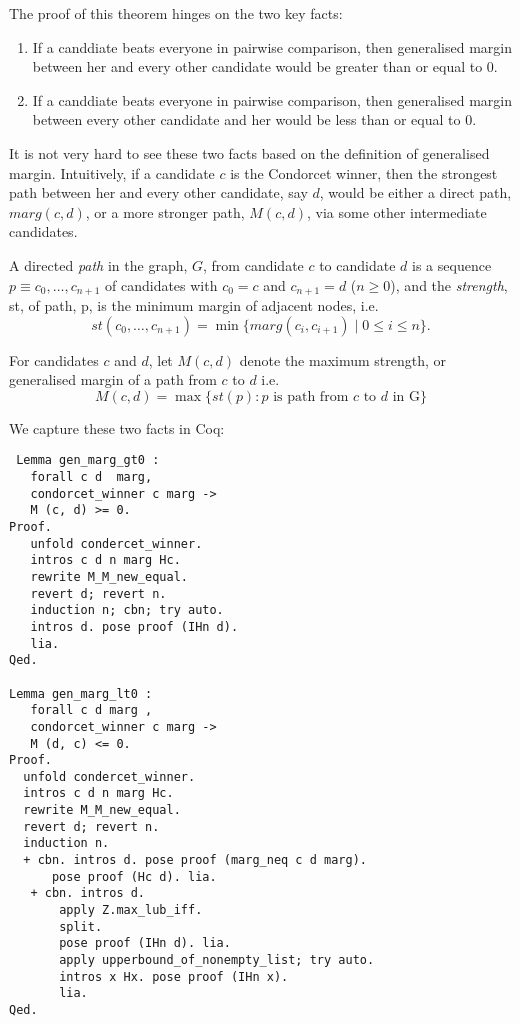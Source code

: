  The proof of this theorem hinges on the two key facts:
 \begin{enumerate}
  \item If a canddiate beats everyone in pairwise comparison, then generalised margin between her and every other candidate would 
      be  greater than or equal to 0.
  \item If a canddiate beats everyone in pairwise comparison, then generalised margin between every other candidate and her would 
      be  less than or equal to 0.
 \end{enumerate}
 
 
 It is not very hard to see these two facts based on the definition of generalised margin. Intuitively, 
 if a candidate $c$ is the Condorcet winner, then the strongest path between her and every other 
 candidate, say $d$,  would be either a direct path, $marg (c, d)$, or a more stronger path, $M (c, d)$, 
 via some other intermediate candidates. 
  
 \begin{displayquote}
 A directed \emph{path} in the graph, $G$, from
candidate $c$ to candidate $d$ is a sequence $p \equiv c_0, \dots, c_{n+1}$
of candidates with $c_0 = c$ and $c_{n+1} = d$ ($n \geq 0$), and the
\emph{strength}, st, of path, p, is the minimum margin of adjacent
nodes, i.e.
\[ st(c_0, \dots, c_{n+1}) = \min \lbrace marg (c_i, c_{i+1}) \mid 0
\leq i \leq n \rbrace. \]
\item For candidates $c$ and $d$, let $M(c, d)$ denote the maximum strength, or generalised margin of a path
	from $c$ to $d$ i.e. 
	\[ M(c, d) = \max \lbrace st (p) : p \text{  is path from } c \text{ to } d \text{ in G} \rbrace\]
  
   \end{displayquote}
   
 We capture these two facts in Coq:
 
 \begin{verbatim}
 Lemma gen_marg_gt0 :
   forall c d  marg, 
   condorcet_winner c marg -> 
   M (c, d) >= 0.
Proof. 
   unfold condercet_winner.
   intros c d n marg Hc.
   rewrite M_M_new_equal. 
   revert d; revert n.
   induction n; cbn; try auto.
   intros d. pose proof (IHn d).
   lia.
Qed.

Lemma gen_marg_lt0 :
   forall c d marg , 
   condorcet_winner c marg ->
   M (d, c) <= 0.
Proof.
  unfold condercet_winner.
  intros c d n marg Hc.
  rewrite M_M_new_equal.
  revert d; revert n.
  induction n.
  + cbn. intros d. pose proof (marg_neq c d marg).
      pose proof (Hc d). lia. 
   + cbn. intros d.
       apply Z.max_lub_iff. 
       split.
       pose proof (IHn d). lia.
       apply upperbound_of_nonempty_list; try auto.
       intros x Hx. pose proof (IHn x).
       lia.
Qed.
\end{verbatim}   
 
